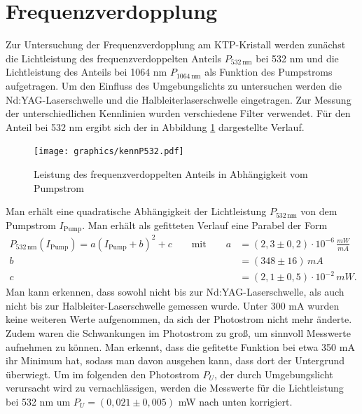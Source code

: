 \documentclass[twoside,colorback,accentcolor=tud4c,11pt]{tudreport}
\begin{document}
\section{Frequenzverdopplung}
Zur Untersuchung der Frequenzverdopplung am KTP-Kristall werden zunächst die Lichtleistung des frequenzverdoppelten Anteils $P_{532\,\text{nm}}$ bei 532 nm und die Lichtleistung des Anteils bei 1064 nm $P_{1064\,\text{nm}}$ als Funktion des Pumpstroms aufgetragen. Um den Einfluss des Umgebungslichts zu untersuchen werden die Nd:YAG-Laserschwelle und die Halbleiterlaserschwelle eingetragen. Zur Messung der unterschiedlichen Kennlinien wurden verschiedene Filter verwendet. Für den Anteil bei 532 nm ergibt sich der in Abbildung \ref{a_4.4_1} dargestellte Verlauf.
\begin{figure}[H]
\centering
   	\begin{minipage}[b]{0.85\textwidth}
   	\texttt{[image: graphics/kennP532.pdf]}
  	\label{a_4.4_1}
   	\end{minipage}
\caption{Leistung des frequenzverdoppelten Anteils in Abhängigkeit vom Pumpstrom}	
\end{figure}
Man erhält eine quadratische Abhängigkeit der Lichtleistung $P_{532\,\text{nm}}$ von dem Pumpstrom $I_{\text{Pump}}$. Man erhält als gefitteten Verlauf eine Parabel der Form
\begin{align*}
P_{532\,\text{nm}}(I_{\text{Pump}})= a(I_{\text{Pump}}+b)^2+c
\qquad\text{mit}\qquad
a&=(2,3 \pm 0,2)\cdot 10^{-6}\,\frac{\si{mW}}{\si{mA}}\\
b&=(348 \pm 16)  \,\si{mA}\\
c&=(2,1\pm0,5)\cdot 10^{-2} \,\si{mW}.
\end{align*}
Man kann erkennen, dass sowohl nicht bis zur Nd:YAG-Laserschwelle, als auch nicht bis zur Halbleiter-Laserschwelle gemessen wurde. Unter 300 mA wurden keine weiteren Werte aufgenommen, da sich der Photostrom nicht mehr änderte. Zudem waren die Schwankungen im Photostrom zu groß, um sinnvoll Messwerte aufnehmen zu können. Man erkennt, dass die gefitette Funktion bei etwa 350 mA ihr Minimum hat, sodass man davon ausgehen kann, dass dort der Untergrund überwiegt. Um im folgenden den Photostrom $P_U$, der durch Umgebungslicht verursacht wird zu vernachlässigen, werden die Messwerte für die Lichtleistung bei 532 nm um  $P_U=(0,021\pm0,005)$ mW nach unten korrigiert.\\
\pagebreak 
\end{document}

